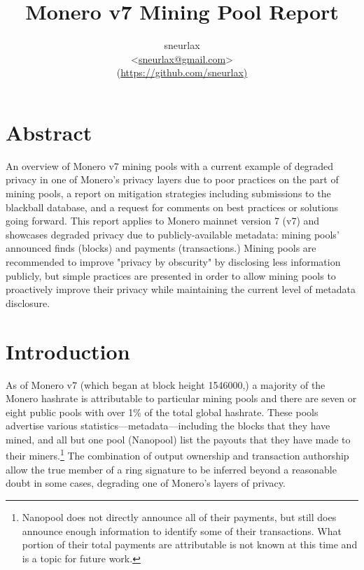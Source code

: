 \documentclass[notitlepage]{report}
\title{Monero v7 Mining Pool Report}
\author{sneurlax \\
\textless\url{sneurlax@gmail.com}\textgreater \\
(\url{https://github.com/sneurlax)}}
\begin{document}
\maketitle
\thispagestyle{empty}

\section*{Abstract}

An overview of Monero v7 mining pools with a current example of degraded privacy in one of Monero's privacy layers due to poor practices on the part of mining pools, a report on mitigation strategies including submissions to the blackball database, and a request for comments on best practices or solutions going forward.  This report applies to Monero mainnet version 7 (v7) and showcases degraded privacy due to publicly-available metadata: mining pools' announced finds (blocks) and payments (transactions.)  Mining pools are recommended to improve "privacy by obscurity" by disclosing less information publicly, but simple practices are presented in order to allow mining pools to proactively improve their privacy while maintaining the current level of metadata disclosure.

\clearpage
\setcounter{page}{1}

\tableofcontents

\section{Introduction}

As of Monero v7 (which began at block height 1546000,) a majority of the Monero hashrate is attributable to particular mining pools and there are seven or eight public pools with over 1\% of the total global hashrate.  These pools advertise various statistics---metadata---including the blocks that they have mined, and all but one pool (Nanopool) list the payouts that they have made to their miners.\footnote{Nanopool does not directly announce all of their payments, but still does announce enough information to identify some of their transactions.  What portion of their total payments are attributable is not known at this time and is a topic for future work.}  The combination of output ownership and transaction authorship allow the true member of a ring signature to be inferred beyond a reasonable doubt in some cases, degrading one of Monero's layers of privacy.
\end{document}
